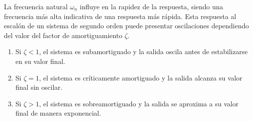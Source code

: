 La frecuencia natural $\omega_n$ influye en la rapidez de la respuesta, siendo una frecuencia más alta indicativa de una respuesta más rápida. Esta respuesta al escalón de un sistema de segundo orden puede presentar oscilaciones dependiendo del valor del factor de amortiguamiento $\zeta$.%
\begin{enumerate}
    \item Si $\zeta < 1$, el sistema es subamortiguado y la salida oscila antes de estabilizarse en su valor final.
    \item Si $\zeta = 1$, el sistema es críticamente amortiguado y la salida alcanza su valor final sin oscilar.
    \item Si $\zeta > 1$, el sistema es sobreamortiguado y la salida se aproxima a su valor final de manera exponencial.
\end{enumerate}


